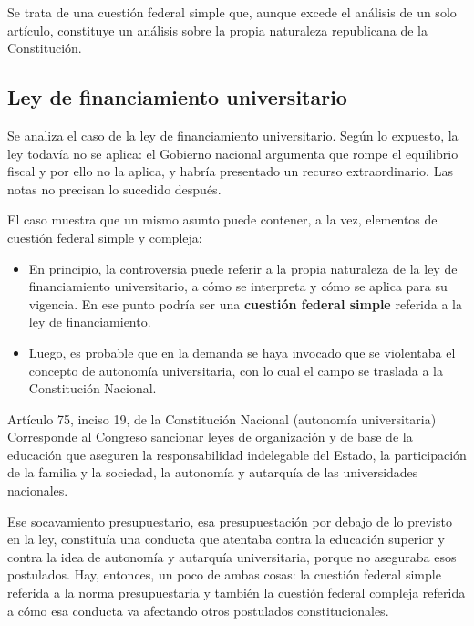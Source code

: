 \documentclass[12pt,oneside]{book}
\begin{document}
Se trata de una cuestión federal simple que, aunque excede el análisis de un solo artículo, constituye un análisis sobre la propia naturaleza republicana de la Constitución.

\subsection{Ley de financiamiento universitario}

Se analiza el caso de la ley de financiamiento universitario. Según lo expuesto, la ley todavía no se aplica: el Gobierno nacional argumenta que rompe el equilibrio fiscal y por ello no la aplica, y habría presentado un recurso extraordinario. Las notas no precisan lo sucedido después.

El caso muestra que un mismo asunto puede contener, a la vez, elementos de cuestión federal simple y compleja:

\begin{itemize}
    \item En principio, la controversia puede referir a la propia naturaleza de la ley de financiamiento universitario, a cómo se interpreta y cómo se aplica para su vigencia. En ese punto podría ser una \textbf{cuestión federal simple} referida a la ley de financiamiento.
    \item Luego, es probable que en la demanda se haya invocado que se violentaba el concepto de autonomía universitaria, con lo cual el campo se traslada a la Constitución Nacional.
\end{itemize}

\begin{norma}{Artículo 75, inciso 19, de la Constitución Nacional (autonomía universitaria)}
Corresponde al Congreso sancionar leyes de organización y de base de la educación que aseguren la responsabilidad indelegable del Estado, la participación de la familia y la sociedad, la autonomía y autarquía de las universidades nacionales.
\end{norma}

Ese socavamiento presupuestario, esa presupuestación por debajo de lo previsto en la ley, constituía una conducta que atentaba contra la educación superior y contra la idea de autonomía y autarquía universitaria, porque no aseguraba esos postulados. Hay, entonces, un poco de ambas cosas: la cuestión federal simple referida a la norma presupuestaria y también la cuestión federal compleja referida a cómo esa conducta va afectando otros postulados constitucionales.
\end{document}
